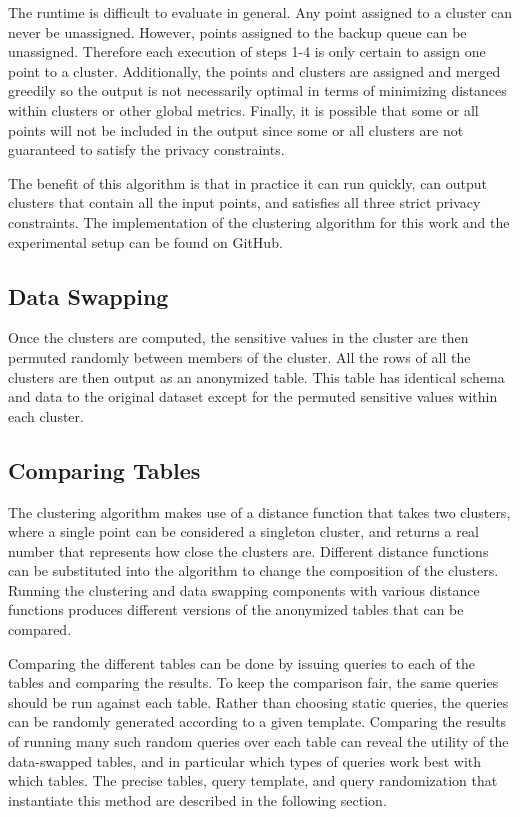The runtime is difficult to evaluate in general. Any point assigned to a cluster can never be unassigned. However, points assigned to the backup queue can be unassigned. Therefore each execution of steps 1-4 is only certain to assign one point to a cluster. Additionally, the points and clusters are assigned and merged greedily so the output is not necessarily optimal in terms of minimizing distances within clusters or other global metrics. Finally, it is possible that some or all points will not be included in the output since some or all clusters are not guaranteed to satisfy the privacy constraints.

The benefit of this algorithm is that in practice it can run quickly, can output clusters that contain all the input points, and satisfies all three strict privacy constraints. The implementation of the clustering algorithm for this work and the experimental setup can be found on GitHub\cite{lDiversityClusteringGithub}.

\subsection{Data Swapping}
Once the clusters are computed, the sensitive values in the cluster are then permuted randomly between members of the cluster. All the rows of all the clusters are then output as an anonymized table. This table has identical schema and data to the original dataset except for the permuted sensitive values within each cluster.

\subsection{Comparing Tables}
The clustering algorithm makes use of a distance function that takes two clusters, where a single point can be considered a singleton cluster, and returns a real number that represents how close the clusters are. Different distance functions can be substituted into the algorithm to change the composition of the clusters. Running the clustering and data swapping components with various distance functions produces different versions of the anonymized tables that can be compared.

Comparing the different tables can be done by issuing queries to each of the tables and comparing the results. To keep the comparison fair, the same queries should be run against each table. Rather than choosing static queries, the queries can be randomly generated according to a given template. Comparing the results of running many such random queries over each table can reveal the utility of the data-swapped tables, and in particular which types of queries work best with which tables. The precise tables, query template, and query randomization that instantiate this method are described in the following section.

